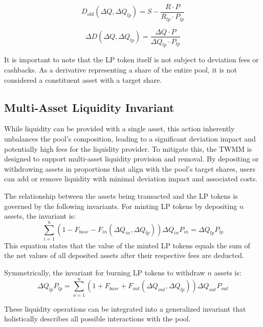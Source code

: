 \begin{equation}
	\label{eq:old_deviation_function_formula_for_lp}
	D_{old}(\Delta Q, \Delta Q_{lp}) = S - \frac{R \cdot P}{R_{lp} \cdot P_{lp}}
\end{equation}	

\begin{equation}
	\label{eq:deviation_delta_function_formula_for_lp}
	\Delta D(\Delta Q, \Delta Q_{lp}) = \frac{\Delta Q \cdot P}{\Delta Q_{lp} \cdot P_{lp}} 
\end{equation}	

It is important to note that the LP token itself is not subject to deviation fees or cashbacks. As a derivative representing a share of the entire pool, it is not considered a constituent asset with a target share.

\subsection{Multi-Asset Liquidity Invariant}
While liquidity can be provided with a single asset, this action inherently unbalances the pool's composition, leading to a significant deviation impact and potentially high fees for the liquidity provider. To mitigate this, the TWMM is designed to support multi-asset liquidity provision and removal. By depositing or withdrawing assets in proportions that align with the pool's target shares, users can add or remove liquidity with minimal deviation impact and associated costs.

The relationship between the assets being transacted and the LP tokens is governed by the following invariants. For minting LP tokens by depositing $n$ assets, the invariant is:
\begin{equation}
	\label{eq:invariant_lp_mint}
	\sum_{i=1}^{n} 
	(1 -  F_{base} - F_{in}(\Delta Q_{in}, \Delta Q_{lp})) \Delta Q_{in} P_{in}  
	= 
	\Delta Q_{lp} P_{lp} 
\end{equation}
This equation states that the value of the minted LP tokens equals the sum of the net values of all deposited assets after their respective fees are deducted.

Symmetrically, the invariant for burning LP tokens to withdraw $n$ assets is:
\begin{equation}
	\label{eq:invariant_lp_mint}
	\Delta Q_{lp} P_{lp}  =
	\sum_{o=1}^{n} 
	(1 + F_{base} + F_{out}(\Delta Q_{out}, \Delta Q_{lp})) \Delta Q_{out} P_{out}  
\end{equation}

These liquidity operations can be integrated into a generalized invariant that holistically describes all possible interactions with the pool.